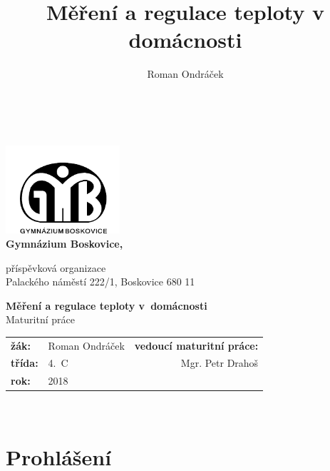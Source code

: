 \documentclass[12pt,a4paper]{article}
\author{Roman Ondráček}
\title{Měření a regulace teploty v domácnosti}
\begin{document}
\renewcommand{\baselinestretch}{1.5}
\pagestyle{empty}

\begin{center}

~ \vspace{64pt}

\includegraphics[width = 160px]{img/gymbos-logo.png}  \\[8pt]

{\LARGE \textbf{Gymnázium Boskovice,} \\}

\begin{large}
příspěvková organizace \\
Palackého náměstí 222/1, Boskovice 680 11 \\
\end{large}

\vspace{64pt}

{\huge \textbf{Měření a regulace teploty v~domácnosti} \\}
{\LARGE Maturitní práce \\}

\vspace{64pt}

\begin{large}
\begin{tabular}{llr}
\textbf{žák:} & Roman Ondráček & \textbf{vedoucí maturitní práce:} \\
\textbf{třída:} & 4.~C & Mgr. Petr Drahoš \\
\textbf{rok:} & 2018 &  \\ 
\end{tabular} 
\end{large}

\end{center}

\newpage

~ \vspace{160mm}

\section*{Prohlášení}
\end{document}
